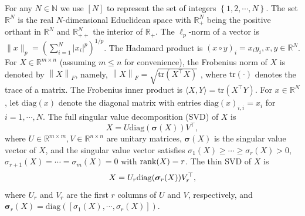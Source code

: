 \documentclass[twoside,11pt]{article}
\numberwithin{equation}{section}
\begin{document}
For any $N\in\mathbb{N} $ we use $[N]$ to represent the set of integers $\left\{1,2,\cdots,N \right\}$.  
The set $\mathbb{R}^{N}$ is the real $N$-dimensional Educlidean space with $\mathbb{R}_{+}^{N}$ being the positive orthant in $\mathbb{R}^{N}$ and $\mathbb{R}_{++}^{N}$ the interior of $\mathbb{R}_{+}$.
The $\ell_{p}$-norm of a vector is $\|x\|_{p} =  \left(\sum_{i=1}^{N} |x_{i}|^{p} \right)^{1/p} $. 
The Hadamard product is $(x\circ{y})_{i} = x_{i}y_{i},x,y\in\mathbb{R}^{N}$.  
For $X\in\mathbb{R}^{m\times n}$ (assuming $m\le n$ for convenience), the Frobenius norm of $X $ is denoted by $\left\|X\right\|_{F} $, namely, $\left\|X\right\|_{F} = \sqrt{\mathrm{tr} \left(X^{\top}X\right)} $ , where $\mathrm{tr} (\cdot) $ denotes the trace of a matrix. 
The Frobenius inner product is $\langle X,Y\rangle=\mathrm{tr} \left(X^{\top}Y\right) $. 
For $x\in\mathbb{R}^{N}$, let $\mathrm{diag}(x) $ denote the diagonal matrix with entries $\mathrm{diag} \left(x\right)_{i,i} = x_{i} $ for $i=1,\cdots,N$.
The full singular value decomposition (SVD) \cite{general_svd_dec} of $X $ is
\begin{equation}\label{eq_svd_sorted}
  X = U\mathrm{diag} \left(\bm{\sigma} (X)\right) V^{\top},
\end{equation}
where $U\in\mathbb{R}^{m\times m},V\in\mathbb{R}^{n\times n} $ are unitary matrices, $\bm{\sigma}(X)$ is the singular value vector of $X$, and the singular value vector satisfies $\sigma_{1} (X)\ge\cdots\ge\sigma_{r} (X)>0$, $\sigma_{r+1} (X)=\cdots=\sigma_{m} (X)=0$ with ${\rm rank}(X) = r$. 
The thin SVD of $X $ is
\begin{equation}
  X = U_{r}  {\rm diag}(\bm{\sigma}_{r}(X)) V_{r}^{\top},
\end{equation}    
where $U_{r}$ and $V_{r} $ are the first $r$ columns of $U$ and $V$, respectively, and $\bm{\sigma}_{r}(X)=\mathrm{diag} ([\sigma_{1} (X),\cdots,\sigma_{r} (X)]) $.  
 
%
\end{document}
